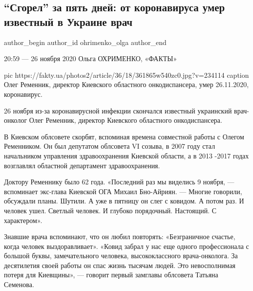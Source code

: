  
 
 
 
 
 
\subsection{\enquote{Сгорел} за пять дней: от коронавируса умер известный в Украине врач}
\label{sec:26_11_2020.news.ua.fakty.ohrimenko_olga.1.death_covid_oleg_remennik}
\ifcmt
	author_begin
   author_id ohrimenko_olga
	author_end
\fi


20:59 --- 26 ноября 2020
Ольга ОХРИМЕНКО, «ФАКТЫ»

\ifcmt
pic https://fakty.ua/photos2/article/36/18/361865w540zc0.jpg?v=234114
caption Олег Ременник, директор Киевского областного онкодиспансера, умер 26.11.2020, коронавирус.
\fi

26 ноября из-за коронавирусной инфекции скончался известный украинский
врач-онколог Олег Ременник, директор Киевского областного онкодиспансера.

В Киевском облсовете скорбят, вспоминая времена совместной работы с Олегом
Ременником. Он был депутатом облсовета VI созыва, в 2007 году стал
начальником управления здравоохранения Киевской области, а в 2013 -2017
годах возглавлял областной департамент здравоохранения.

Доктору Ременнику было 62 года. «Последний раз мы виделись 9 ноября,
--- вспоминает экс-глава Киевской ОГА Михаил Бно-Айриян. --- Многие говорили,
обсуждали планы. Шутили. А уже в пятницу он слег с ковидом. А потом раз.
И человек ушел. Светлый человек. И глубоко порядочный. Настоящий.
С характером».

Знавшие врача вспоминают, что он любил повторять: «Безграничное счастье,
когда человек выздоравливает». «Ковид забрал у нас еще одного
профессионала с большой буквы, замечательного человека, высококлассного
врача-онколога. За десятилетия своей работы он спас жизнь тысячам людей.
Это невосполнимая потеря для Киевщины», --- говорит первый замглавы
облсовета Татьяна Семенова.

